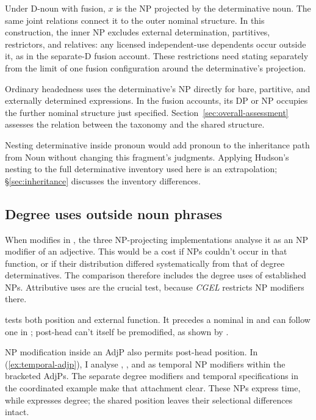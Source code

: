 \documentclass[12pt]{article}
\begin{document}
Under D-noun with fusion, $x$ is the NP projected by the determinative noun. The same joint relations connect it to the outer nominal structure. In this construction, the inner NP excludes external determination, partitives, restrictors, and relatives: any licensed independent-use dependents occur outside it, as in the separate-D fusion account. These restrictions need stating separately from the limit of one fusion configuration around the determinative's projection.

Ordinary headedness uses the determinative's NP directly for bare, partitive, and externally determined expressions. In the fusion accounts, its DP or NP occupies the further nominal structure just specified. Section~\ref{sec:overall-assessment} assesses the relation between the taxonomy and the shared structure.

Nesting determinative inside pronoun would add pronoun to the inheritance path from Noun without changing this fragment's judgments. Applying Hudson's nesting to the full determinative inventory used here is an extrapolation; §\ref{sec:inheritance} discusses the inventory differences.

\subsection{Degree uses outside noun phrases}\label{sec:enough}

When  modifies  in , the three NP-projecting implementations analyse it as an NP modifier of an adjective. This would be a cost if NPs couldn't occur in that function, or if their distribution differed systematically from that of degree determinatives. The comparison therefore includes the degree uses of established NPs. Attributive uses are the crucial test, because \textit{CGEL} restricts NP modifiers there.

 tests both position and external function. It precedes a nominal in  and can follow one in ; post-head  can't itself be premodified, as shown by  \citep[396--397, 445]{huddleston2002}.

NP modification inside an AdjP also permits post-head position. In (\ref{ex:temporal-adjp}), I analyse , , and  as temporal NP modifiers within the bracketed AdjPs. The separate degree modifiers and temporal specifications in the coordinated example make that attachment clear. These NPs express time, while  expresses degree; the shared position leaves their selectional differences intact.
\end{document}
